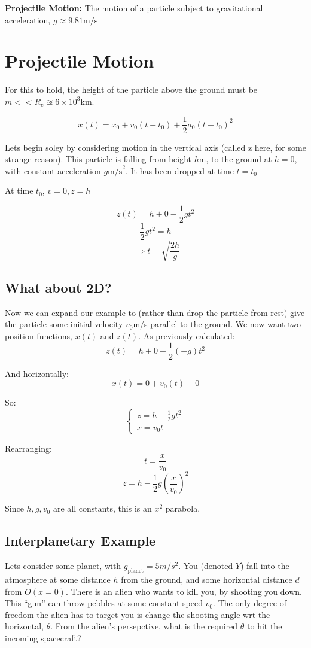 
\textbf{Projectile Motion: } The motion of a particle subject to gravitational acceleration, $g \approx 9.81 \text{m/s}$

\section*{Projectile Motion}

For this to hold, the height of the particle above the ground must be $m << R_e \approxeq 6 \times 10^3$km.

\[
    x(t) = x_0 + v_0(t - t_0) + \frac{1}{2} a_0 (t-t_0)^2
\]

Lets begin soley by considering motion in the vertical axis (called z here, for some strange reason). This particle is falling from height $h$m, to the ground at $h = 0$, with constant acceleration $g \text{m/s}^2$. It has been dropped at time $t = t_0$

At time $t_0$, $v = 0, z = h$

\[
    z(t) = h + 0 - \frac{1}{2}gt^2
\]
\[
    \frac{1}{2}gt^2 = h
\]
\[
    \implies t = \sqrt{\frac{2h}{g}}
\]

\subsection*{What about 2D?}
Now we can expand our example to (rather than drop the particle from rest) give the particle some initial velocity $v_0$m/s parallel to the ground. We now want two position functions, $x(t)$ and $z(t)$. As previously calculated:
\[
    z(t) = h + 0 + \frac{1}{2}(-g)t^2
\]

And horizontally:
\[
    x(t) = 0 + v_0(t) + 0
\]

So:
\[
    \begin{cases}
    z = h - \frac{1}{2}gt^2 \\
    x = v_0 t
    \end{cases}
\]

Rearranging:
\[
    t = \frac{x}{v_0}
\]
\[
    z = h - \frac{1}{2}g\left(\frac{x}{v_0}\right)^2
\]

Since $h, g, v_0$ are all constants, this is an $x^2$ parabola.

\subsection*{Interplanetary Example}
Lets consider some planet, with $g_{\text{planet}} = 5m/s^2$. You (denoted $Y$) fall into the atmosphere at some distance $h$ from the ground, and some horizontal distance $d$ from $O (x = 0)$. There is an alien who wants to kill you, by shooting you down. This ``gun'' can throw pebbles at some constant speed $v_0$. The only degree of freedom the alien has to target you is change the shooting angle wrt the horizontal, $\theta$. From the alien's persepctive, what is the required $\theta$ to hit the incoming spacecraft?

